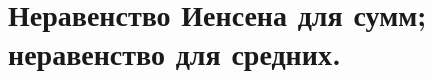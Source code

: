 \documentclass[../main.tex]{subfiles}
\begin{document}
\newpage
\section{Неравенство Иенсена для сумм; неравенство для средних.}
\end{document}
